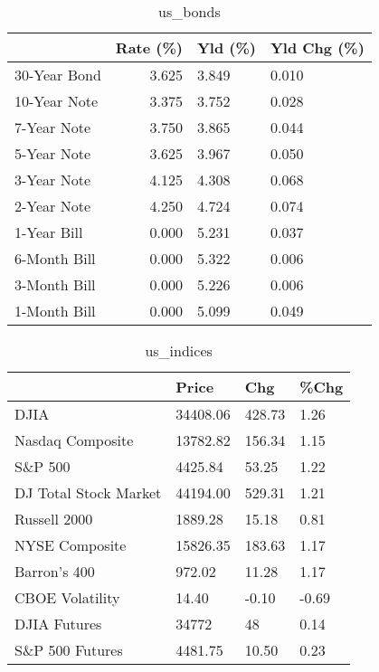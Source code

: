 \documentclass{article}%
\begin{document}
%


\begin{table}[htbp]%
\caption{us\_bonds}%
\centering%
\begin{adjustbox}{width=1\textwidth}%
\begin{tabular}{lrll}
\toprule
             &  Rate (\%) & Yld (\%) & Yld Chg (\%) \\
\midrule
30-Year Bond &     3.625 &   3.849 &       0.010 \\
10-Year Note &     3.375 &   3.752 &       0.028 \\
 7-Year Note &     3.750 &   3.865 &       0.044 \\
 5-Year Note &     3.625 &   3.967 &       0.050 \\
 3-Year Note &     4.125 &   4.308 &       0.068 \\
 2-Year Note &     4.250 &   4.724 &       0.074 \\
 1-Year Bill &     0.000 &   5.231 &       0.037 \\
6-Month Bill &     0.000 &   5.322 &       0.006 \\
3-Month Bill &     0.000 &   5.226 &       0.006 \\
1-Month Bill &     0.000 &   5.099 &       0.049 \\
\bottomrule
\end{tabular}
%
\end{adjustbox}%
\end{table}

%


\begin{table}[htbp]%
\caption{us\_indices}%
\centering%
\begin{adjustbox}{width=1\textwidth}%
\begin{tabular}{llll}
\toprule
                      &    Price &    Chg &  \%Chg \\
\midrule
                 DJIA & 34408.06 & 428.73 &  1.26 \\
     Nasdaq Composite & 13782.82 & 156.34 &  1.15 \\
              S\&P 500 &  4425.84 &  53.25 &  1.22 \\
DJ Total Stock Market & 44194.00 & 529.31 &  1.21 \\
         Russell 2000 &  1889.28 &  15.18 &  0.81 \\
       NYSE Composite & 15826.35 & 183.63 &  1.17 \\
         Barron's 400 &   972.02 &  11.28 &  1.17 \\
      CBOE Volatility &    14.40 &  -0.10 & -0.69 \\
         DJIA Futures &    34772 &     48 &  0.14 \\
      S\&P 500 Futures &  4481.75 &  10.50 &  0.23 \\
\bottomrule
\end{tabular}
%
\end{adjustbox}%
\end{table}
\end{document}
